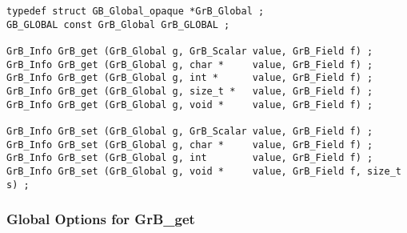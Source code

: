 \begin{mdframed}[userdefinedwidth=6in]
{\footnotesize
\begin{verbatim}
typedef struct GB_Global_opaque *GrB_Global ;
GB_GLOBAL const GrB_Global GrB_GLOBAL ;

GrB_Info GrB_get (GrB_Global g, GrB_Scalar value, GrB_Field f) ;
GrB_Info GrB_get (GrB_Global g, char *     value, GrB_Field f) ;
GrB_Info GrB_get (GrB_Global g, int *      value, GrB_Field f) ;
GrB_Info GrB_get (GrB_Global g, size_t *   value, GrB_Field f) ;
GrB_Info GrB_get (GrB_Global g, void *     value, GrB_Field f) ;

GrB_Info GrB_set (GrB_Global g, GrB_Scalar value, GrB_Field f) ;
GrB_Info GrB_set (GrB_Global g, char *     value, GrB_Field f) ;
GrB_Info GrB_set (GrB_Global g, int        value, GrB_Field f) ;
GrB_Info GrB_set (GrB_Global g, void *     value, GrB_Field f, size_t s) ;
\end{verbatim}
}\end{mdframed}


\subsubsection{Global Options for {\sf GrB\_get}}

